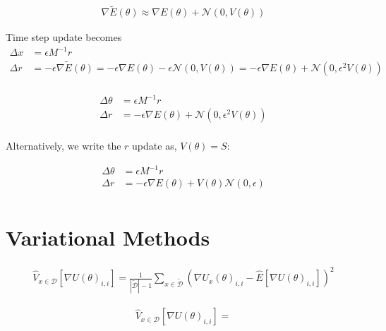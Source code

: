 \begin{align*}
    \nabla\tilde{E}(\theta) \approx \nabla{E}(\theta)  + \mathcal{N}(0, V(\theta))
\end{align*}

Time step update becomes
\begin{align*}
    \Delta x &= \epsilon M^{-1} r \\
    \Delta r &= -\epsilon\nabla\tilde{E}(\theta) 
    = -\epsilon\nabla{E}(\theta)  -\epsilon \mathcal{N}(0, V(\theta))
    = -\epsilon\nabla{E}(\theta)  +\mathcal{N}(0, \epsilon^2 V(\theta)) \\
\end{align*}

\begin{align*}
    \Delta \theta &= \epsilon M^{-1} r \\
    \Delta r &=  -\epsilon\nabla{E}(\theta) + \mathcal{N}(0, \epsilon^2 V(\theta)) \\
\end{align*}


Alternatively, we write the $r$ update as, $V(\theta) = S$:


\begin{align*}
    \Delta \theta &= \epsilon M^{-1} r \\
    \Delta r &=  -\epsilon\nabla{E}(\theta) + V(\theta) \mathcal{N}(0, \epsilon) \\
\end{align*}

\section{Variational Methods}

\begin{align*}
    \hat V_{x\in \mathcal D}[\nabla U(\theta)_{i,i} ] = \frac{1}{|\tilde{\mathcal{D}}|-1} \sum_{x\in \tilde{\mathcal{D}}} (\nabla U_x(\theta)_{i,i} - \hat{E}[\nabla U(\theta)_{i,i}])^2
\end{align*}

\begin{align*}
    \hat V_{x\in \mathcal D}[\nabla U(\theta)_{i,i} ] = 
\end{align*}